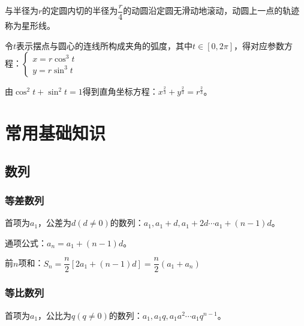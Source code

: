 \documentclass[UTF8, 12pt]{ctexart}
\begin{document}
\begin{minipage}{0.5\linewidth}
    与半径为$r$的定圆内切的半径为$\dfrac{r}{4}$的动圆沿定圆无滑动地滚动，动圆上一点的轨迹称为星形线。

    令$t$表示摆点与圆心的连线所构成夹角的弧度，其中$t\in[0,2\pi]$，得对应参数方程：$
    \left\{
    \begin{array}{lcl}
        x=r\cos^3t \\
        y=r\sin^3t
    \end{array}
    \right.
    $

    由$\cos^2t+\sin^2t=1$得到直角坐标方程：$x^{\frac{2}{3}}+y^{\frac{2}{3}}=r^{\frac{2}{3}}$。
\end{minipage}
\hfill
\begin{minipage}{0.4\linewidth}
\end{minipage}

\section{常用基础知识}
\subsection{数列}
\subsubsection{等差数列}

首项为$a_1$，公差为$d(d\neq 0)$的数列：$a_1,a_1+d,a_1+2d\cdots a_1+(n-1)d$。

通项公式：$a_n=a_1+(n-1)d$。

前$n$项和：$S_n=\dfrac{n}{2}[2a_1+(n-1)d]=\dfrac{n}{2}(a_1+a_n)$

\subsubsection{等比数列}

首项为$a_1$，公比为$q(q\neq 0)$的数列：$a_1,a_1q,a_1a^2\cdots a_1q^{n-1}$。
\end{document}
